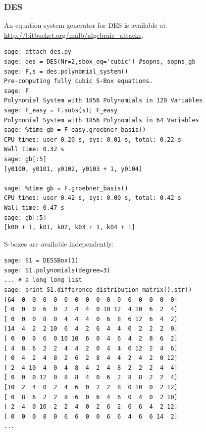 \documentclass[10pt]{beamer}
\begin{document}
\begin{frame}
\frametitle{DES}

An equation system generator for DES is available at \url{http://bitbucket.org/malb/algebraic_attacks}.

\begin{lstlisting}
sage: attach des.py
sage: des = DES(Nr=2,sbox_eq='cubic') #sopns, sopns_gb
sage: F,s = des.polynomial_system()
Pre-computing fully cubic S-Box equations.
sage: F
Polynomial System with 1856 Polynomials in 120 Variables
sage: F_easy = F.subs(s); F_easy
Polynomial System with 1856 Polynomials in 64 Variables
sage: %time gb = F_easy.groebner_basis()
CPU times: user 0.20 s, sys: 0.01 s, total: 0.22 s
Wall time: 0.32 s
sage: gb[:5]
[y0100, y0101, y0102, y0103 + 1, y0104]

sage: %time gb = F.groebner_basis()
CPU times: user 0.42 s, sys: 0.00 s, total: 0.42 s
Wall time: 0.47 s
sage: gb[:5]
[k00 + 1, k01, k02, k03 + 1, k04 + 1]
\end{lstlisting}

\framebreak

S-boxes are available independently:

\begin{lstlisting}
sage: S1 = DESSBox(1)
sage: S1.polynomials(degree=3)
... # a long long list
sage: print S1.difference_distribution_matrix().str()
[64  0  0  0  0  0  0  0  0  0  0  0  0  0  0  0]
[ 0  0  0  6  0  2  4  4  0 10 12  4 10  6  2  4]
[ 0  0  0  8  0  4  4  4  0  6  8  6 12  6  4  2]
[14  4  2  2 10  6  4  2  6  4  4  0  2  2  2  0]
[ 0  0  0  6  0 10 10  6  0  4  6  4  2  8  6  2]
[ 4  8  6  2  2  4  4  2  0  4  4  0 12  2  4  6]
[ 0  4  2  4  8  2  6  2  8  4  4  2  4  2  0 12]
[ 2  4 10  4  0  4  8  4  2  4  8  2  2  2  4  4]
[ 0  0  0 12  0  8  8  4  0  6  2  8  8  2  2  4]
[10  2  4  0  2  4  6  0  2  2  8  0 10  0  2 12]
[ 0  8  6  2  2  8  6  0  6  4  6  0  4  0  2 10]
[ 2  4  0 10  2  2  4  0  2  6  2  6  6  4  2 12]
[ 0  0  0  8  0  6  6  0  0  6  6  4  6  6 14  2]
...
\end{lstlisting}
\end{frame}
\end{document}
